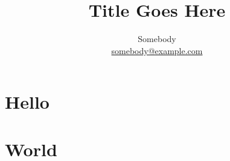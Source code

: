 


\title{Title Goes Here}

\author{%
  Somebody\\
  \url{somebody@example.com}
}


\maketitle

\section{Hello}
\section{World}

\cite{Dasilva:2008:JAW:1454503.1454528}



  


